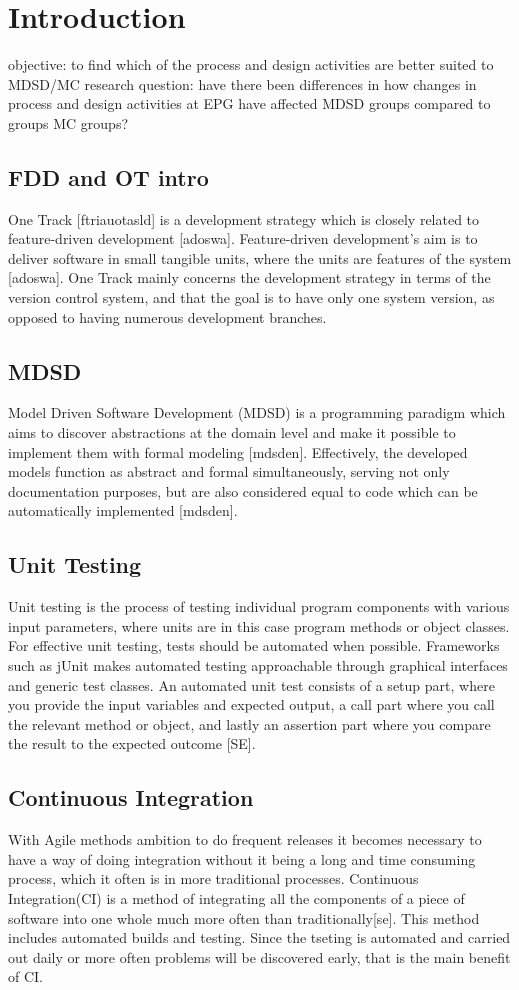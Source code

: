 \documentclass[fina_report_innit.tex]{subfiles}
\begin{document}
\section{Introduction}
objective: to find which of the process and design activities are better suited to MDSD/MC
research question: have there been differences in how changes in process and design activities at EPG have affected MDSD groups compared to groups MC groups?
\subsection{FDD and OT intro}
One Track [ftriauotasld] is a development strategy which is closely related to feature-driven development [adoswa]. Feature-driven development's aim is to deliver software in small tangible units, where the units are features of the system [adoswa]. One Track mainly concerns the development strategy in terms of the version control system, and that the goal is to have only one system version, as opposed to having numerous development branches. 

\subsection{MDSD}
Model Driven Software Development (MDSD) is a programming paradigm which aims to discover abstractions at the domain level and make it possible to implement them with formal modeling [mdsden]. Effectively, the developed models function as abstract and formal simultaneously, serving not only documentation purposes, but are also considered equal to code which can be automatically implemented [mdsden].

\subsection{Unit Testing}
Unit testing is the process of testing individual program components with various input parameters, where units are in this case program methods or object classes.
For effective unit testing, tests should be automated when possible.  Frameworks such as jUnit makes automated testing approachable through graphical interfaces and generic test classes. An automated unit test consists of a setup part, where you provide the input variables and expected output, a call part where you call the relevant method or object, and lastly an assertion part where you compare the result to the expected outcome [SE]. 

\subsection{Continuous Integration}
With Agile methods ambition to do frequent releases it becomes necessary to have a way of doing integration without it being a long and time consuming process, which it often is in more traditional processes. Continuous Integration(CI) is a method of integrating all the components of a piece of software into one whole much more often than traditionally[se]. This method includes automated builds and testing. Since the tseting is automated and carried out daily or more often problems will be discovered early, that is the main benefit of CI. 
\end{document}
